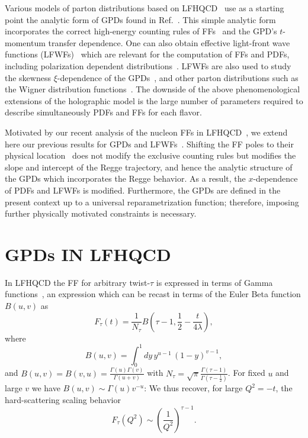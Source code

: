 \documentclass[aps,prl,reprint,groupedaddress, preprintnumbers]{revtex4-1}
\def\be{\begin{equation}}
\def\ee{\end{equation}}
\newcommand{\half}{{\frac{1}{2}}}
\begin{document}
Various models of parton distributions based on LFHQCD~\cite{Abidin:2008sb, Vega:2010ns, Gutsche:2013zia, Chakrabarti:2013gra, Sharma:2014voa, Dehghani:2015jva, Chakrabarti:2015lba, Maji:2015vsa,  Chakrabarti:2017tek,  Mondal:2016xsm, Maji:2016yqo, Traini:2016jko, Traini:2016jru, Gutsche:2016gcd, Maji:2017ill, Rinaldi:2017roc, Bacchetta:2017vzh, Nikkhoo:2017won, Mondal:2017wbf, Kumar:2017dbf, Chouika:2017dhe, Muller:2017wms}  use as a starting point the analytic form of GPDs found in Ref.~\cite{Brodsky:2007hb}. This simple analytic form incorporates the correct high-energy counting rules of FFs~\cite{Brodsky:1973kr, Matveev:ra} and the GPD's $t$-momentum transfer dependence. One can also obtain effective light-front wave functions (LFWFs)~\cite{Brodsky:2014yha, Brodsky:2011xx} which are relevant for the computation of FFs and PDFs, including polarization dependent distributions~\cite{Maji:2017ill, Gutsche:2016gcd, Nikkhoo:2017won}. LFWFs are also used to study the skewness $\xi$-dependence of the GPDs~\cite{Traini:2016jko, Rinaldi:2017roc, Mondal:2017wbf, Chouika:2017dhe, Muller:2017wms}, and other parton distributions such as the Wigner distribution functions~\cite{Chakrabarti:2017tek, Gutsche:2016gcd}. The downside of the above phenomenological extensions of the holographic model is the large number of parameters required to describe simultaneously PDFs and FFs for each flavor.


Motivated by our recent analysis of the nucleon FFs in LFHQCD~\cite{Sufian:2016hwn}, we extend here our previous results for GPDs and LFWFs~\cite{Brodsky:2007hb, Brodsky:2011xx}. Shifting the FF poles to their physical location~\cite{Sufian:2016hwn} does not modify the exclusive counting rules but modifies the slope and intercept of the Regge trajectory, and hence the analytic structure of the GPDs which incorporates the Regge behavior. As a result, the $x$-dependence of PDFs and LFWFs is modified. Furthermore, the GPDs are defined in the present context up to a universal reparametrization function; therefore, imposing further physically motivated constraints is necessary. 



\section{GPDs IN LFHQCD}

In LFHQCD the FF for arbitrary twist-$\tau$ is expressed in terms of Gamma functions~\cite{Brodsky:2007hb, Brodsky:2014yha}, an expression which can be recast in terms of the Euler Beta function $B(u,v)$ as~\cite{Zou:2018eam}
\be \label{FEuler}
F_\tau(t) = \frac{1}{N_\tau} B\left(\tau-1,  \frac{1}{2}- \frac{t}{4 \lambda} \right),
\ee
where
\be \label{intB}
B(u,v)= \int_0^1  dy\, y^{u -1} \, (1-y)^{v -1},
\ee
and $B(u,v) =  B(v, u)=\frac{\Gamma(u) \Gamma(v)}{\Gamma(u + v)}$ with $N_\tau = \sqrt{\pi} \frac{\Gamma(\tau -1)}{\Gamma\left(\tau - \half\right)}$. For fixed $u$ and large $v$ we have $B(u,v) \sim \Gamma(u) v^{-u}$: We thus
recover, for large $Q^2 = - t$, the hard-scattering scaling behavior~\cite{Brodsky:1973kr, Matveev:ra}
\be \label{FFas}
F_\tau(Q^2) \sim \left(\frac{1}{Q^2}\right)^{\tau-1} .
\ee
\end{document}
